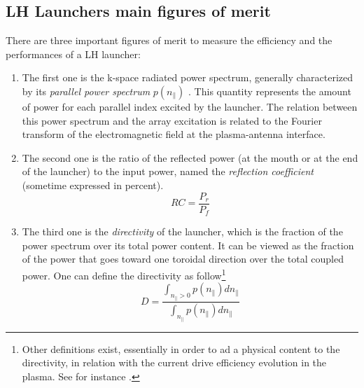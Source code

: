%
%


\subsection{LH Launchers main figures of merit}

There are three important figures of merit to measure the efficiency and the performances of a LH launcher: 
\begin{enumerate}
	\item The first one is the k-space radiated power spectrum, generally characterized by its \emph{parallel power spectrum} $p(n_{\parallel})$ . This quantity represents the amount of power for each parallel index excited by the launcher. The relation between this power spectrum and the array excitation is related to the Fourier transform of the electromagnetic field at the plasma-antenna interface. 
	
	\item  The second one is the ratio of the reflected power (at the mouth or at the end of the launcher) to the input power, named the \emph{reflection coefficient} (sometime expressed in percent). 
	$$RC = \frac{P_r}{P_f}$$
	\item The third one is the \emph{directivity} of the launcher, which is the fraction of the power spectrum over its total power content. It can be viewed as the fraction of the power that goes toward one toroidal direction over the total coupled power. One can define the directivity as follow\footnote{Other definitions exist, essentially in order to ad a physical content to the directivity, in relation with the current drive efficiency evolution in the plasma. See for instance .}
	$$
	D
	= 
	\frac{
		\int_{n_{\parallel} >0} p(n_{\parallel}) dn_{\parallel} 
	}{
		\int_{n_{\parallel}} p(n_{\parallel}) dn_{\parallel} } 
	$$
\end{enumerate}

